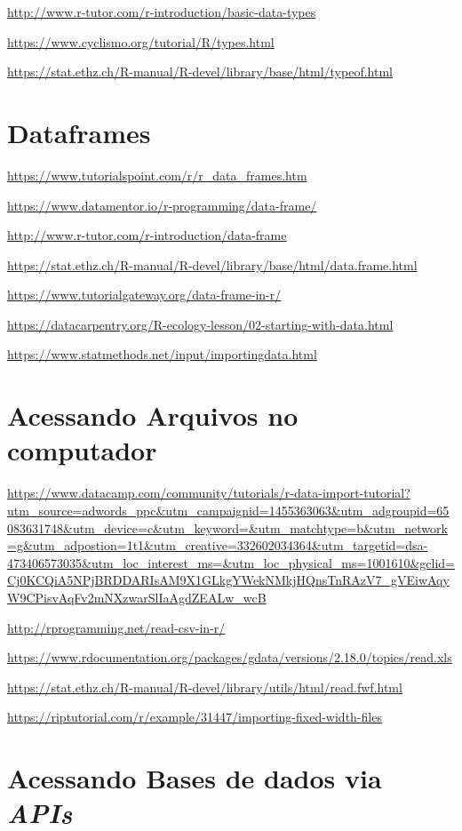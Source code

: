 \documentclass[12pt,a4paper,oneside]{erdc}\usepackage[]{graphicx}\usepackage[]{color}
\begin{document}
\url{http://www.r-tutor.com/r-introduction/basic-data-types}

\url{https://www.cyclismo.org/tutorial/R/types.html}

\url{https://stat.ethz.ch/R-manual/R-devel/library/base/html/typeof.html}

\section{Dataframes}

\url{https://www.tutorialspoint.com/r/r_data_frames.htm}

\url{https://www.datamentor.io/r-programming/data-frame/}

\url{http://www.r-tutor.com/r-introduction/data-frame}

\url{https://stat.ethz.ch/R-manual/R-devel/library/base/html/data.frame.html}

\url{https://www.tutorialgateway.org/data-frame-in-r/}

\url{https://datacarpentry.org/R-ecology-lesson/02-starting-with-data.html}

\url{https://www.statmethods.net/input/importingdata.html}

\section{Acessando Arquivos no computador}

\url{https://www.datacamp.com/community/tutorials/r-data-import-tutorial?utm_source=adwords_ppc&utm_campaignid=1455363063&utm_adgroupid=65083631748&utm_device=c&utm_keyword=&utm_matchtype=b&utm_network=g&utm_adpostion=1t1&utm_creative=332602034364&utm_targetid=dsa-473406573035&utm_loc_interest_ms=&utm_loc_physical_ms=1001610&gclid=Cj0KCQiA5NPjBRDDARIsAM9X1GLkgYWekNMkjHQnsTnRAzV7_gVEiwAqyW9CPisvAqFv2mNXzwarSlIaAgdZEALw_wcB}

\url{http://rprogramming.net/read-csv-in-r/}

\url{https://www.rdocumentation.org/packages/gdata/versions/2.18.0/topics/read.xls}

\url{https://stat.ethz.ch/R-manual/R-devel/library/utils/html/read.fwf.html}

\url{https://riptutorial.com/r/example/31447/importing-fixed-width-files}


\section{Acessando Bases de dados via \textit{APIs}}
\end{document}
